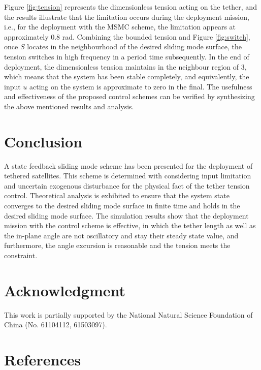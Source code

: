 \documentclass[3p]{elsarticle}
\theoremstyle{plain}
\begin{document}
Figure \ref{fig:tension} represents the dimensionless tension acting on the tether, and the results illustrate that the limitation occurs during the deployment mission, i.e., for the deployment with the MSMC scheme, the limitation appears at approximately 0.8 rad. Combining the bounded tension and Figure \ref{fig:switch}, once $S$ locates in the neighbourhood of the desired sliding mode surface, the tension switches in high frequency in a period time subsequently. In the end of deployment, the dimensionless tension maintains in the neighbour region of $3$, which means that the system has been stable completely, and equivalently, the input $u$ acting on the system is approximate to zero in the final. The usefulness and effectiveness of the proposed control schemes can be verified by synthesizing the above mentioned results and analysis.\par
\section{Conclusion}\label{sec:Conclusion}
A state feedback sliding mode scheme has been presented for the deployment of tethered satellites. This scheme is determined with considering input limitation and uncertain exogenous disturbance for the physical fact of the tether tension control. Theoretical analysis is exhibited to ensure that the system state converges to the desired sliding mode surface in finite time and holds in the desired sliding mode surface. The simulation results show that the deployment mission with the control scheme is effective, in which the tether length as well as the in-plane angle are not oscillatory and stay their steady state value, and furthermore, the angle excursion is reasonable and the tension meets the constraint.
\section{Acknowledgment}
This work is partially supported by the National Natural Science Foundation of China (No. 61104112, 61503097).
\section{References}


\end{document}
